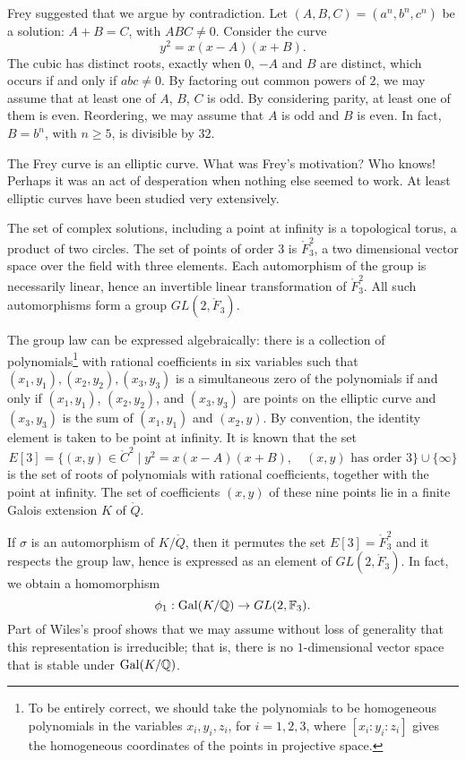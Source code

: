 \documentclass{amsart}
\begin{document}
Frey suggested that we argue by contradiction.  Let
$(A,B,C)=(a^n,b^n,c^n)$ be a solution: $A+B=C$, with $ABC\ne
0$. Consider the curve
\[
y^2 = x (x - A) (x + B).
\]
The cubic has distinct roots, exactly when $0$, $-A$ and $B$ are
distinct, which occurs if and only if $abc\ne 0$.  By factoring out
common powers of $2$, we may assume that at least one of $A$, $B$, $C$
is odd.  By considering parity, at least one of them is even.
Reordering, we may assume that $A$ is odd and $B$ is even.  In fact,
$B=b^n$, with $n\ge 5$, is divisible by $32$.


The Frey curve is an elliptic curve.  What was Frey's motivation?  Who
knows! Perhaps it was an act of desperation when nothing else seemed
to work. At least elliptic curves have been studied very extensively.

The set of complex solutions, including a point at infinity is a
topological torus, a product of two circles.  The set of points of
order $3$ is $\ring{F}_3^2$, a two dimensional vector space over the
field with three elements.  Each automorphism of the group is
necessarily linear, hence an invertible linear transformation of
$\ring{F}^2_3$.  All such automorphisms form a group
$GL(2,\ring{F}_3)$.

The group law can be expressed algebraically: there is a collection of
polynomials\footnote{To be entirely correct, we should take the
  polynomials to be homogeneous polynomials in the variables
  $x_i,y_i,z_i$, for $i=1,2,3$, where $[x_i:y_i:z_i]$ gives the
  homogeneous coordinates of the points in projective space.}  with
rational coefficients in six variables such that
$(x_1,y_1),(x_2,y_2),(x_3,y_3)$ is a simultaneous zero of the
polynomials if and only if $(x_1,y_1)$, $(x_2,y_2)$, and $(x_3,y_3)$
are points on the elliptic curve and $(x_3,y_3)$ is the sum of
$(x_1,y_1)$ and $(x_2,y)$.  By convention, the identity element is
taken to be point at infinity.  It is known that the set
\[
E[3]= \{(x,y) \in \ring{C}^2\mid y^2 = x (x-A) (x+B), 
\quad (x,y) \text{ has order } 3\}\cup \{\infty\}
\]
is the set of roots of polynomials with rational coefficients,
together with the point at infinity.  The set of coefficients $(x,y)$
of these nine points lie in a finite Galois extension $K$ of
$\ring{Q}$.

If $\sigma$ is an automorphism of $K/\ring{Q}$, then it permutes the
set $E[3]=\ring{F}_3^2$ and it respects the group law, hence is
expressed as an element of $GL(2,\ring{F}_3)$.  In fact, we obtain a
homomorphism
\[
\phi_1 : {\operatorname{Gal}}(K/\mathbb{Q}) \to GL(2,\mathbb{F}_3).
\]
Part of Wiles's proof shows that we may assume without loss of
generality that this representation is irreducible; that is, there is
no $1$-dimensional vector space that is stable under
${\operatorname{Gal}}(K/\mathbb{Q})$.
\end{document}
